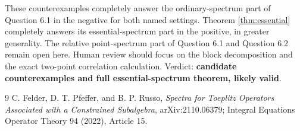 \documentclass[11pt]{article}
\begin{document}
These counterexamples completely answer the ordinary-spectrum part of
Question 6.1 in the negative for both named settings.  Theorem
\ref{thm:essential} completely answers its essential-spectrum part in the
positive, in greater generality.  The relative point-spectrum part of
Question 6.1 and Question 6.2 remain open here.  Human review should focus on
the block decomposition and the exact two-point correlation calculation.
Verdict: \textbf{candidate counterexamples and full essential-spectrum
theorem, likely valid}.

\begin{thebibliography}{9}
C. Felder, D. T. Pfeffer, and B. P. Russo,
\emph{Spectra for Toeplitz Operators Associated with a Constrained
Subalgebra}, arXiv:2110.06379; Integral Equations Operator Theory 94 (2022),
Article 15.
\end{thebibliography}
\end{document}
